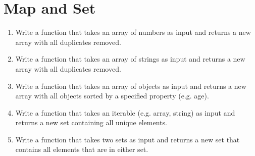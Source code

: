 \documentclass{article}
\begin{document}
\section{Map and Set}
\begin{enumerate}
	\item Write a function that takes an array of numbers as input and returns a new array with all duplicates removed.
	\item Write a function that takes an array of strings as input and returns a new array with all duplicates removed.
	\item Write a function that takes an array of objects as input and returns a new array with all objects sorted by a specified property (e.g. age).
	\item Write a function that takes an iterable (e.g. array, string) as input and returns a new set containing all unique elements.
	\item Write a function that takes two sets as input and returns a new set that contains all elements that are in either set.
\end{enumerate}
\end{document}
